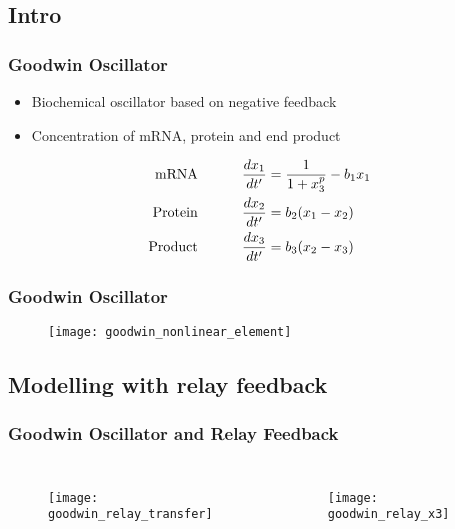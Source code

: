 \documentclass[11pt]{beamer}
\begin{document}
\subsection{Intro}
\begin{frame}
	\frametitle{Goodwin Oscillator}
	
	\begin{itemize}
	\item Biochemical oscillator based on negative feedback
	\item Concentration of mRNA, protein and end product
	\end{itemize}
	

	\begin{align*}
	\text{mRNA \hspace{1cm}}\frac{dx_1}{dt'} &= \frac{1}{1 + x_3^p} - b_1x_1 \\
	\text{Protein \hspace{1cm}}	\frac{dx_2}{dt'} &= b_2(x_1 - x_2) \\
	\text{Product \hspace{1cm}}	\frac{dx_3}{dt'} &= b_3(x_2 - x_3) \\
	\end{align*}

\end{frame}

\begin{frame}
\frametitle{Goodwin Oscillator}
\begin{figure}
	\texttt{[image: goodwin\_nonlinear\_element]}
\end{figure}
\end{frame}

\subsection{Modelling with relay feedback}
\begin{frame}
\frametitle{Goodwin Oscillator and Relay Feedback}
\begin{columns}
\begin{figure}
\texttt{[image: goodwin\_relay\_transfer]}
\end{figure}
\begin{figure}
\texttt{[image: goodwin\_relay\_x3]}
\end{figure}
\end{columns}
\end{frame}
\end{document}
